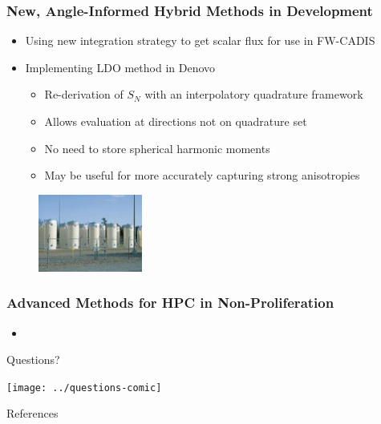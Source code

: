 \documentclass[xcolor=x11names,compress]{beamer}
\renewcommand{\(}{\begin{columns}}
\renewcommand{\)}{\end{columns}}
\newcommand{\<}[1]{\begin{column}{#1}}
\renewcommand{\>}{\end{column}}
\begin{document}
\begin{frame}[fragile]
  \frametitle{New, Angle-Informed Hybrid Methods in Development}

	\begin{itemize}
	\item Using new integration strategy to get scalar flux for use in 
	      FW-CADIS \cite{Peplow2012}
	\item Implementing LDO method \cite{Ahrens2014} in Denovo
	  \begin{itemize}
	  \item Re-derivation of $S_N$ with an interpolatory quadrature framework
	  \item Allows evaluation at directions not on quadrature set
	  \item No need to store spherical harmonic moments
	  \item May be useful for more accurately capturing strong anisotropies
	  \end{itemize}
	\end{itemize}
	
	\begin{center}
 	\begin{figure}
 	\includegraphics[height=1in,clip]{../figs/isfsi}
    \end{figure}
 	\end{center}

\end{frame}

\begin{frame}[fragile]
  \frametitle{Advanced Methods for HPC in Non-Proliferation}

	\begin{itemize}
	\item 
	\end{itemize}

\end{frame}

\begin{frame}[fragile]{Questions?}

    \begin{center}
    \texttt{[image: ../questions-comic]}  
    \end{center}
  
\end{frame}

\begin{frame}[allowframebreaks]{References}
	
	
\end{frame}
\end{document}
